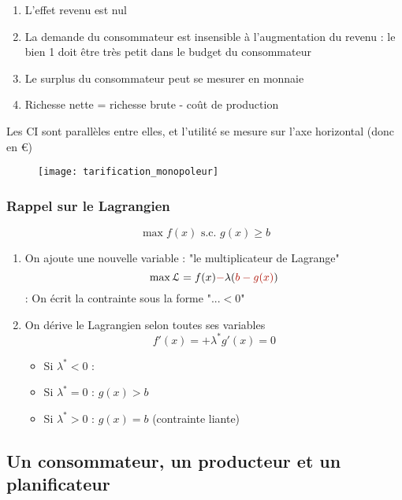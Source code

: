 \begin{enumerate}
\item L'effet revenu est nul
\item La demande du consommateur est insensible à l'augmentation du revenu : le bien 1 doit être très petit dans le budget du consommateur
\item Le surplus du consommateur peut se mesurer en monnaie
\item Richesse nette = richesse brute - coût de production
\end{enumerate}
Les CI sont parallèles entre elles, et l'utilité se mesure sur l'axe horizontal (donc en €)

\begin{figure}[H]
	\centering
	\texttt{[image: tarification\_monopoleur]}
\end{figure}

\subsubsection{Rappel sur le Lagrangien}

\begin{equation*}
\max f(x) \text{ s.c. } g(x) \geq b
\end{equation*}
\begin{enumerate}
\item On ajoute une nouvelle variable : "le multiplicateur de Lagrange"
	\begin{equation*}
	\max \Lagr = f(x) \textred{-} \lambda (\textred{b - g(x)})
	\end{equation*}
	 : On écrit la contrainte sous la forme "$... < 0$"
\item On dérive le Lagrangien selon toutes ses variables
	\begin{equation*}
	f'(x) = + \lambda^* g'(x) = 0
	\end{equation*}
	\begin{itemize}
	\item Si $\lambda^* < 0$ : 
	\item Si $\lambda^* = 0$ : $g(x) > b$
	\item Si $\lambda^* > 0$ : $g(x) = b$ (contrainte liante)
	\end{itemize}
\end{enumerate}

\subsection{Un consommateur, un producteur et un planificateur}

